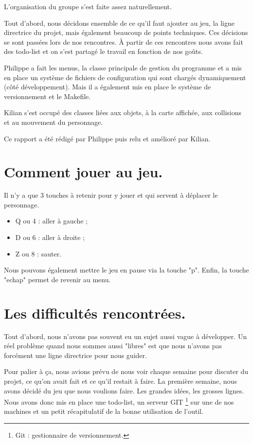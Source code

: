L'organisation du groupe s'est faite assez naturellement.

Tout d'abord, nous décidons ensemble de ce qu'il faut ajouter au jeu, 
la ligne directrice du projet, mais également beaucoup de points techniques.
Ces décisions se sont passées lors de nos rencontres.
À partir de ces rencontres nous avons fait des todo-list et on s'est partagé le travail en fonction de nos goûts.

Philippe a fait les menus, la classe principale de gestion du programme et a mis en place un système de fichiers de configuration qui sont chargés dynamiquement (côté développement).
Mais il a également mis en place le système de versionnement et le Makefile.

Kilian s'est occupé des classes liées aux objets, à la carte affichée, aux collisions et au mouvement du personnage.

Ce rapport a été rédigé par Philippe puis relu et amélioré par Kilian.

\section{Comment jouer au jeu.}

Il n'y a que 3 touches à retenir pour y jouer et qui servent à déplacer le personnage.

\begin{itemize}
	\item Q ou 4 : aller à gauche ;
	\item D ou 6 : aller à droite ;
	\item Z ou 8 : sauter.
\end{itemize}

Nous pouvons également mettre le jeu en pause via la touche "p".
Enfin, la touche "echap" permet de revenir au menu.

\section{Les difficultés rencontrées.}

Tout d'abord, nous n'avons pas souvent eu un sujet aussi vague à développer.
Un réel problème quand nous sommes aussi "libres" est que nous n'avons pas forcément une ligne directrice pour nous guider.

Pour palier à ça, nous avions prévu de nous voir chaque semaine pour discuter du projet, ce qu'on avait fait et ce qu'il restait à faire.
La première semaine, nous avons décidé du jeu que nous voulions faire.
Les grandes idées, les grosses lignes.
Nous avons donc mis en place une todo-list, un serveur \cite{GIT} GIT \protect\footnote{Git : gestionnaire de versionnement. } sur une de nos machines et un petit récapitulatif de la bonne utilisation de l'outil.

